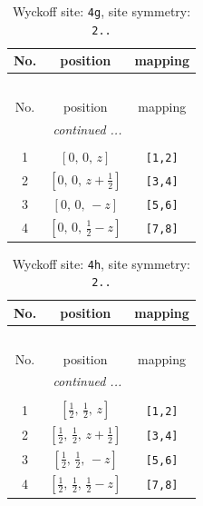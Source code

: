 \documentclass[fleqn,8pt]{jsarticle}
\begin{document}
\begin{longtable}{ccc}
\caption{Wyckoff site: {\tt 4g}, site symmetry: {\tt 2..}}
 \\
 \hline \hline
No. & position & mapping \\ \hline \endfirsthead

\multicolumn{2}{l}{\tablename\ \thetable{}} \\
 \hline \hline
No. & position & mapping \\ \hline \endhead

 \hline \hline
\multicolumn{2}{r}{\footnotesize\it continued ...} \\ \endfoot

 \hline \hline
\multicolumn{2}{r}{} \\ \endlastfoot

1 & $\left[ 0,\, 0,\, z \right]$ & {\tt [1,2]} \\ \hline
2 & $\left[ 0,\, 0,\, z + \frac{1}{2} \right]$ & {\tt [3,4]} \\ \hline
3 & $\left[ 0,\, 0,\, - z \right]$ & {\tt [5,6]} \\ \hline
4 & $\left[ 0,\, 0,\, \frac{1}{2} - z \right]$ & {\tt [7,8]} \\
\end{longtable}
\renewcommand{\arraystretch}{1.2}
\begin{longtable}{ccc}
\caption{Wyckoff site: {\tt 4h}, site symmetry: {\tt 2..}}
 \\
 \hline \hline
No. & position & mapping \\ \hline \endfirsthead

\multicolumn{2}{l}{\tablename\ \thetable{}} \\
 \hline \hline
No. & position & mapping \\ \hline \endhead

 \hline \hline
\multicolumn{2}{r}{\footnotesize\it continued ...} \\ \endfoot

 \hline \hline
\multicolumn{2}{r}{} \\ \endlastfoot

1 & $\left[ \frac{1}{2},\, \frac{1}{2},\, z \right]$ & {\tt [1,2]} \\ \hline
2 & $\left[ \frac{1}{2},\, \frac{1}{2},\, z + \frac{1}{2} \right]$ & {\tt [3,4]} \\ \hline
3 & $\left[ \frac{1}{2},\, \frac{1}{2},\, - z \right]$ & {\tt [5,6]} \\ \hline
4 & $\left[ \frac{1}{2},\, \frac{1}{2},\, \frac{1}{2} - z \right]$ & {\tt [7,8]} \\
\end{longtable}
\end{document}
